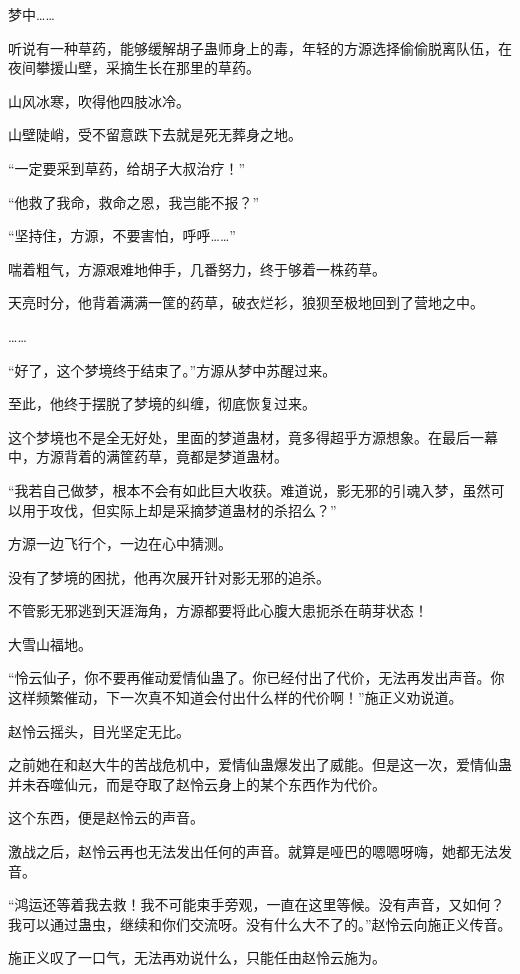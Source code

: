 \begin{this_body}
梦中……

听说有一种草药，能够缓解胡子蛊师身上的毒，年轻的方源选择偷偷脱离队伍，在夜间攀援山壁，采摘生长在那里的草药。

山风冰寒，吹得他四肢冰冷。

山壁陡峭，受不留意跌下去就是死无葬身之地。

“一定要采到草药，给胡子大叔治疗！”

“他救了我命，救命之恩，我岂能不报？”

“坚持住，方源，不要害怕，呼呼……”

喘着粗气，方源艰难地伸手，几番努力，终于够着一株药草。

天亮时分，他背着满满一筐的药草，破衣烂衫，狼狈至极地回到了营地之中。

……

“好了，这个梦境终于结束了。”方源从梦中苏醒过来。

至此，他终于摆脱了梦境的纠缠，彻底恢复过来。

这个梦境也不是全无好处，里面的梦道蛊材，竟多得超乎方源想象。在最后一幕中，方源背着的满筐药草，竟都是梦道蛊材。

“我若自己做梦，根本不会有如此巨大收获。难道说，影无邪的引魂入梦，虽然可以用于攻伐，但实际上却是采摘梦道蛊材的杀招么？”

方源一边飞行个，一边在心中猜测。

没有了梦境的困扰，他再次展开针对影无邪的追杀。

不管影无邪逃到天涯海角，方源都要将此心腹大患扼杀在萌芽状态！

大雪山福地。

“怜云仙子，你不要再催动爱情仙蛊了。你已经付出了代价，无法再发出声音。你这样频繁催动，下一次真不知道会付出什么样的代价啊！”施正义劝说道。

赵怜云摇头，目光坚定无比。

之前她在和赵大牛的苦战危机中，爱情仙蛊爆发出了威能。但是这一次，爱情仙蛊并未吞噬仙元，而是夺取了赵怜云身上的某个东西作为代价。

这个东西，便是赵怜云的声音。

激战之后，赵怜云再也无法发出任何的声音。就算是哑巴的嗯嗯呀嗨，她都无法发音。

“鸿运还等着我去救！我不可能束手旁观，一直在这里等候。没有声音，又如何？我可以通过蛊虫，继续和你们交流呀。没有什么大不了的。”赵怜云向施正义传音。

施正义叹了一口气，无法再劝说什么，只能任由赵怜云施为。


\end{this_body}

